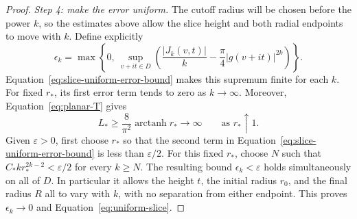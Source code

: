 \begin{proof}
\medskip
\noindent\textit{Step 4: make the error uniform.}
The cutoff radius will be chosen before the power $k$, so the estimates
above allow the slice height and both radial endpoints to move with $k$.
Define explicitly
\begin{equation}\label{eq:slice-error-sequence}
 \epsilon_k=
 \max\left\{0,\ \sup_{v+it\in D}
     \left(\frac{|J_k(v,t)|}{k}
                  -\frac{\pi}{4}|g(v+it)|^{2k}\right)\right\}.
\end{equation}
Equation~\eqref{eq:slice-uniform-error-bound} makes this supremum finite
for each \(k\).  For fixed \(r_*\), its first error term tends to zero
as \(k\to\infty\).  Moreover, Equation~\eqref{eq:planar-T} gives
\[
 L_*\ge\frac{8}{\pi^2}\operatorname{arctanh}r_*
       \longrightarrow\infty
 \qquad\text{as }r_*\uparrow1.
\]
Given \(\varepsilon>0\), first choose \(r_*\) so that the second term
in Equation~\eqref{eq:slice-uniform-error-bound} is less than
\(\varepsilon/2\).  For this fixed \(r_*\), choose \(N\) such that
\(C_*k r_*^{2k-2}<\varepsilon/2\) for every \(k\ge N\).
The resulting bound \(\epsilon_k<\varepsilon\) holds simultaneously
on all of \(D\).  In particular it allows the height \(t\), the initial
radius \(r_0\), and the final radius \(R\) all to vary with \(k\), with
no separation from either endpoint.  This proves
\(\epsilon_k\to0\) and Equation~\eqref{eq:uniform-slice}.
\end{proof}
